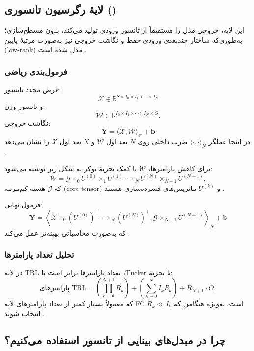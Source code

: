 \subsection{لایهٔ رگرسیون تانسوری ()}

این لایه، خروجی مدل را مستقیماً از تانسور ورودی تولید می‌کند، بدون مسطح‌سازی؛ به‌طوری‌که ساختار چندبعدی ورودی حفظ و نگاشت خروجی نیز به‌صورت مرتبۀ پایین (low‑rank) مدل شده است \cite{kossaifi2020tensorregression}.

\subsubsection*{فرمول‌بندی ریاضی}

فرض مجدد تانسور:
\[
\mathcal{X} \in \mathbb{R}^{S \times I_0 \times I_1 \times \cdots \times I_N}
\]
و تانسور وزن:
\[
\mathcal{W} \in \mathbb{R}^{I_0 \times I_1 \times \cdots \times I_N \times O}.
\]
نگاشت خروجی:
\[
\mathbf{Y} = \langle \mathcal{X}, \mathcal{W} \rangle_N + \mathbf{b}
\]
در اینجا عملگر \(\langle \cdot,\cdot \rangle_N\) ضرب داخلی روی \(N\) بعد اول \(\mathcal{W}\) و \(N\) بعد اول \(\mathcal{X}\) را نشان می‌دهد \cite{kossaifi2020tensorregression}.

برای کاهش پارامترها، \(\mathcal{W}\)‌ با کمک تجزیۀ توکر به شکل زیر نوشته می‌شود:
\[
\mathcal{W} = \mathcal{G} \times_0 U^{(0)} \times_1 U^{(1)} \cdots \times_N U^{(N)} \times_{N+1} U^{(N+1)},
\]
که \(\mathcal{G}\) هستهٔ کم‌مرتبه (core tensor) و \(U^{(k)}\) ماتریس‌های فشرده‌سازی هستند \cite{kossaifi2020tensorregression}.

فرمول نهایی:
\[
\mathbf{Y} = \left\langle \mathcal{X} \times_0 (U^{(0)})^\top \cdots \times_N (U^{(N)})^\top, \mathcal{G} \times_{N+1} U^{(N+1)} \right\rangle_N + \mathbf{b}
\]
که به‌صورت محاسباتی بهینه‌تر عمل می‌کند \cite{kossaifi2020tensorregression}.

\subsubsection*{تحلیل تعداد پارامترها}

در لایه TRL با تجزیۀ \(\text{Tucker}\)، تعداد پارامترها برابر است با:
\[
\text{پارامترهای TRL} = \left(\prod_{k=0}^{N+1} R_k\right) + \left(\sum_{k=0}^{N} I_k R_k\right) + R_{N+1} \cdot O,
\]
که معمولاً بسیار کمتر از تعداد پارامترهای لایه FC است، به‌ویژه هنگامی که \(R_k \ll I_k\) انتخاب شوند \cite{kossaifi2020tensorregression}.


\subsection{چرا در مبدل‌های بینایی از تانسور استفاده می‌کنیم؟}

